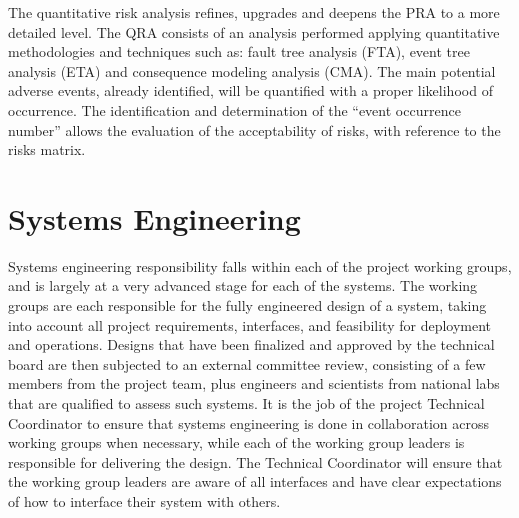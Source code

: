 The quantitative risk analysis refines, upgrades and deepens the PRA to a more detailed level.  The QRA consists of an analysis performed applying quantitative methodologies and techniques such as: fault tree analysis (FTA), event tree analysis (ETA) and consequence modeling analysis (CMA).  The main potential adverse events, already identified, will be quantified with a proper likelihood of occurrence.  The identification and determination of the ``event occurrence number'' allows the evaluation of the acceptability of risks, with reference to the risks matrix.





\section{Systems Engineering}

Systems engineering responsibility falls within each of the project working groups, and is largely at a very advanced stage for each of the systems.  The working groups are each responsible for the fully engineered design of a system, taking into account all project requirements, interfaces, and feasibility for deployment and operations.  Designs that have been finalized and approved by the technical board are then subjected to an external committee review, consisting of a few members from the project team, plus engineers and scientists from national labs that are qualified to assess such systems.  It is the job of the project Technical Coordinator to ensure that systems engineering is done in collaboration across working groups when necessary, while each of the working group leaders is responsible for delivering the design.  The Technical Coordinator will ensure that the working group leaders are aware of all interfaces and have clear expectations of how to interface their system with others.  

